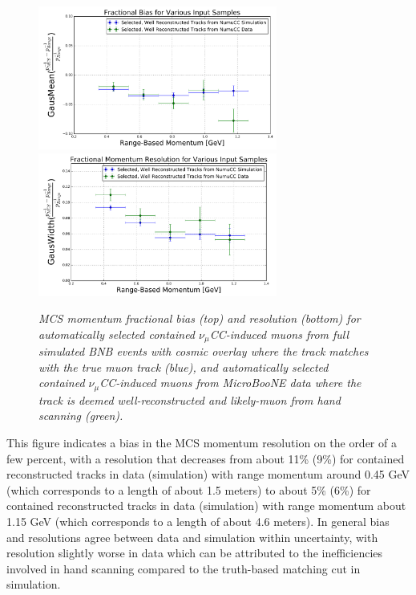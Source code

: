 \documentclass[a4paper,11pt]{article}
\begin{document}
\begin{figure}
\centering
	\includegraphics[width=0.7\textwidth]{Figures/MCS_range_bias_multiplesamples_publicplot.png}
	\includegraphics[width=0.7\textwidth]{Figures/MCS_range_resolution_multiplesamples_publicplot.png}
\caption{\textit{MCS momentum fractional bias (top) and resolution (bottom) for automatically selected contained $\nu_\mu$CC-induced muons from full simulated BNB events with cosmic overlay where the track matches with the true muon track (blue), and automatically selected contained $\nu_\mu$CC-induced muons from MicroBooNE data where the track is deemed well-reconstructed and likely-muon from hand scanning (green).}}\label{MCS_range_bias_resolution_DataRecoTrack_fig}
\end{figure}

This figure indicates a bias in the MCS momentum resolution on the order of a few percent, with a resolution that decreases from about 11\% (9\%) for contained reconstructed tracks in data (simulation) with range momentum around 0.45 GeV (which corresponds to a length of about 1.5 meters) to about 5\% (6\%) for contained reconstructed tracks in data (simulation) with range momentum about 1.15 GeV (which corresponds to a length of about 4.6 meters). In general bias and resolutions agree between data and simulation within uncertainty, with resolution slightly worse in data which can be attributed to the inefficiencies involved in hand scanning compared to the truth-based matching cut in simulation.
\end{document}
